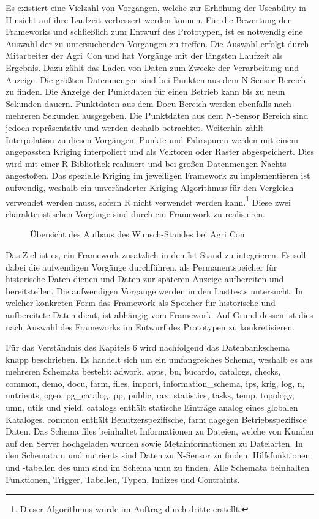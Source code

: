 Es existiert eine Vielzahl von Vorgängen, welche zur Erhöhung der Useability in Hinsicht auf ihre Laufzeit verbessert werden können.
Für die Bewertung der Frameworks und schließlich zum Entwurf des Prototypen, ist es notwendig eine Auswahl der zu untersuchenden Vorgängen zu treffen.
Die Auswahl erfolgt durch Mitarbeiter der Agri~Con und hat Vorgänge mit der längsten Laufzeit als Ergebnis.
Dazu zählt das Laden von Daten zum Zwecke der Verarbeitung und Anzeige.
Die größten Datenmengen sind bei Punkten aus dem N-Sensor Bereich zu finden.
Die Anzeige der Punktdaten für einen Betrieb kann bis zu neun Sekunden dauern.
Punktdaten aus dem Docu Bereich werden ebenfalls nach mehreren Sekunden ausgegeben.
Die Punktdaten aus dem N-Sensor Bereich sind jedoch repräsentativ und werden deshalb betrachtet.
Weiterhin zählt Interpolation zu diesen Vorgängen.
Punkte und Fahrspuren werden mit einem angepassten Kriging interpoliert und als Vektoren oder Raster abgespeichert.
Dies wird mit einer R Bibliothek realisiert und bei großen Datenmengen Nachts angestoßen.
Das spezielle Kriging im jeweiligen Framework zu implementieren ist aufwendig, weshalb ein unveränderter Kriging Algorithmus für den Vergleich verwendet werden muss, sofern R nicht verwendet werden kann.\footnote{Dieser Algorithmus wurde im Auftrag durch dritte erstellt.}
Diese zwei charakteristischen Vorgänge sind durch ein Framework zu realisieren.

\begin{figure}[h!]
\centering

\caption[Aufbau Wunsch-Stand]{\"{U}bersicht des Aufbaus des Wunsch-Standes bei Agri Con}
\label{fig:wunschstand}
\end{figure}
Das Ziel ist es, ein Framework zusätzlich in den Ist-Stand zu integrieren.
Es soll dabei die aufwendigen Vorgänge durchführen, als Permanentspeicher für historische Daten dienen und Daten zur späteren Anzeige aufbereiten und bereitstellen.
Die aufwendigen Vorgänge werden in den Lasttests untersucht.
In welcher konkreten Form das Framework als Speicher für historische und aufbereitete Daten dient, ist abhängig vom Framework.
Auf Grund dessen ist dies nach Auswahl des Frameworks im Entwurf des Prototypen zu konkretisieren.

Für das Verständnis des Kapitels 6 wird nachfolgend das Datenbankschema knapp beschrieben.
Es handelt sich um ein umfangreiches Schema, weshalb es aus mehreren Schemata besteht:
adwork, apps, bu, bucardo, catalogs, checks, common, demo, docu, farm, files, import, information\_{}schema, ips, krig, log, n, nutrients, ogeo, pg\_{}catalog, pp, public, rax, statistics, tasks, temp, topology, umn, utils und yield.
catalogs enthält statische Einträge analog eines globalen Kataloges.
common enthält Benutzerspezifische, farm dagegen Betriebsspezifisce Daten.
Das Schema files beinhaltet Informationen zu Dateien, welche von Kunden auf den Server hochgeladen wurden sowie Metainformationen zu Dateiarten.
In den Schemata n und nutrients sind Daten zu N-Sensor zu finden.
Hilfsfunktionen und -tabellen des \Gls{umn} sind im Schema umn zu finden.
Alle Schemata beinhalten Funktionen, Trigger, Tabellen, Typen, Indizes und Contraints.

